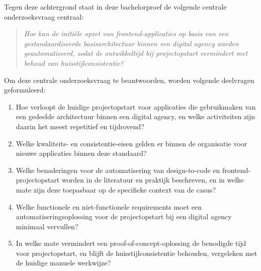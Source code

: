 Tegen deze achtergrond staat in deze bachelorproef de volgende centrale onderzoeksvraag centraal:
\begin{quote}
\emph{Hoe kan de initiële opzet van frontend-applicaties op basis van een gestandaardiseerde basisarchitectuur binnen een digital agency worden geautomatiseerd, zodat de ontwikkeltijd bij projectopstart vermindert met behoud van huisstijlconsistentie?}
\end{quote}

Om deze centrale onderzoeksvraag te beantwoorden, worden volgende deelvragen geformuleerd:
\begin{enumerate}
  \item Hoe verloopt de huidige projectopstart voor applicaties die gebruikmaken van een gedeelde architectuur binnen een digital agency, en welke activiteiten zijn daarin het meest repetitief en tijdrovend?
  \item Welke kwaliteits- en consistentie-eisen gelden er binnen de organisatie voor nieuwe applicaties binnen deze standaard?
  \item Welke benaderingen voor de automatisering van design-to-code en frontend-projec\-topstart worden in de literatuur en praktijk beschreven, en in welke mate zijn deze toepasbaar op de specifieke context van de casus?
  \item Welke functionele en niet-functionele requirements moet een automatiseringsoplossing voor de projectopstart bij een digital agency minimaal vervullen?
  \item In welke mate vermindert een proof-of-con\-cept-oplossing de benodigde tijd voor projectopstart, en blijft de huisstijlconsistentie behouden, vergeleken met de huidige manuele werkwijze?
\end{enumerate}

